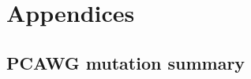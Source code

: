 \newpage
\setcounter{table}{0}
\setcounter{figure}{0}
\setcounter{section}{0}
\renewcommand\thesection{A.\arabic{section}} 
\renewcommand\thefigure{A\arabic{figure}} 
\renewcommand\thetable{A\arabic{table}} 

\chapter*{Appendices}

\section{PCAWG mutation summary}

